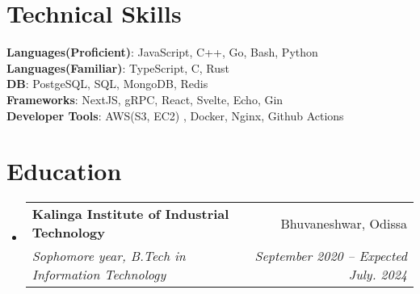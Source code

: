 \documentclass[letterpaper,11pt]{article}
\makeatletter
\newcommand{\resumeSubheading}[4]{
  \vspace{-2pt}\item
    \begin{tabular*}{0.97\textwidth}[t]{l@{\extracolsep{\fill}}r}
      \textbf{#1} & #2 \\
      \textit{\small#3} & \textit{\small #4} \\
    \end{tabular*}\vspace{-7pt}
}
\newcommand{\resumeSubHeadingListStart}{\begin{itemize}[leftmargin=0.15in, label={}]}
\newcommand{\resumeSubHeadingListEnd}{\end{itemize}}
\makeatother
\begin{document}
%
\section{Technical Skills}
 \begin{itemize}[leftmargin=0.15in, label={}]
    \small{\item{
     \textbf{Languages(Proficient)}{: JavaScript, C++, Go, Bash, Python } \\
      \textbf{Languages(Familiar)}{: TypeScript, C, Rust } \\
      \textbf{DB}{: PostgeSQL, SQL, MongoDB, Redis } \\
     \textbf{Frameworks}{: NextJS, gRPC, React, Svelte, Echo, Gin  } \\
     \textbf{Developer Tools}{: AWS(S3, EC2) , Docker, Nginx, Github Actions } \\
    }}
 \end{itemize}
 
\section{Education}
  \resumeSubHeadingListStart
    \resumeSubheading
      {Kalinga Institute of Industrial Technology}{Bhuvaneshwar, Odissa}
      {Sophomore year, B.Tech in Information Technology}{September 2020 -- Expected July. 2024}
  \resumeSubHeadingListEnd
\end{document}
